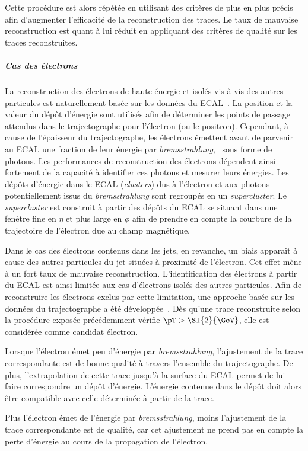 Cette procédure est alors répétée en utilisant des critères de plus en plus précis afin d'augmenter l'efficacité de la reconstruction des traces.
Le taux de mauvaise reconstruction est quant à lui réduit en appliquant des critères de qualité sur les traces reconstruites.
\subparagraph{Cas des électrons}
La reconstruction des électrons de haute énergie et isolés vis-à-vis des autres particules est naturellement basée sur les données du ECAL~\cite{electron_reco_8tev}.
La position et la valeur du dépôt d'énergie sont utilisés afin de déterminer les points de passage attendus dans le trajectographe pour l'électron (ou le positron).
Cependant, à cause de l'épaisseur du trajectographe, les électrons émettent avant de parvenir au ECAL une fraction de leur énergie par \emph{bremsstrahlung}, \ie\ sous forme de photons.
Les performances de reconstruction des électrons dépendent ainsi fortement de la capacité à identifier ces photons et mesurer leurs énergies.
Les dépôts d'énergie dans le ECAL (\emph{clusters}) dus à l'électron et aux photons potentiellement issus du \emph{bremsstrahlung} sont regroupés en un \emph{supercluster}.
Le \emph{supercluster} est construit à partir des dépôts du ECAL se situant dans une fenêtre fine en $\eta$ et plus large en $\phi$ afin de prendre en compte la courbure de la trajectoire de l'électron due au champ magnétique.
\par
Dans le cas des électrons contenus dans les jets, en revanche, un biais apparaît à cause des autres particules du jet situées à proximité de l'électron.
Cet effet mène à un fort taux de mauvaise reconstruction.
L'identification des électrons à partir du ECAL est ainsi limitée aux cas d'électrons isolés des autres particules.
Afin de reconstruire les électrons exclus par cette limitation, une approche basée sur les données du trajectographe a été développée~\cite{particle-flow}.
Dès qu'une trace reconstruite selon la procédure exposée précédemment vérifie $\pT>\SI{2}{\GeV}$, elle est considérée comme candidat électron.
\par
Lorsque l'électron émet peu d'énergie par \emph{bremsstrahlung}, l'ajustement de la trace correspondante est de bonne qualité à travers l'ensemble du trajectographe.
De plus, l'extrapolation de cette trace jusqu'à la surface du ECAL permet de lui faire correspondre un dépôt d'énergie.
L'énergie contenue dans le dépôt doit alors être compatible avec celle déterminée à partir de la trace.
\par
Plus l'électron émet de l'énergie par \emph{bremsstrahlung}, moins l'ajustement de la trace correspondante est de qualité, car cet ajustement ne prend pas en compte la perte d'énergie au cours de la propagation de l'électron.
